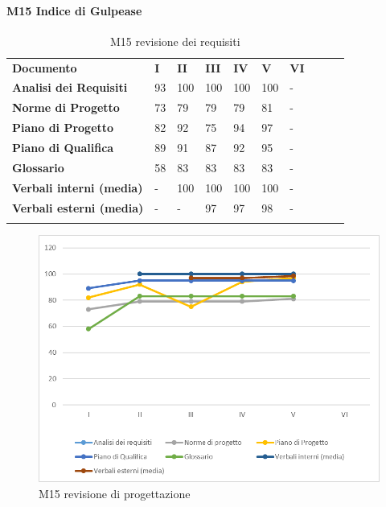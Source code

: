 \paragraph{M15 Indice di Gulpease}\mbox{}
\begin{longtable} {						
		>{}p{50mm}  		
		>{}p{8mm}		
		>{}p{8mm}		
		>{}p{8mm}		
		>{}p{8mm}		
		>{}p{8mm}		
		>{}p{8mm}
		>{}p{8mm}
		>{}p{8mm}
		>{}p{8mm}				
	}			
	\rowcolor{gray!50}
	\textbf{Documento} & \textbf{I} & \textbf{II} & \textbf{III} & \textbf{IV} & \textbf{V} & \textbf{VI} \TBstrut \\ [2mm]
	\textbf{Analisi dei Requisiti} & 93 & 100 & 100 & 100 & 100 & - \TBstrut \\ [2mm]
	\textbf{Norme di Progetto} & 73 & 79 & 79 & 79 & 81 & - \TBstrut \\ [2mm]
	\textbf{Piano di Progetto} & 82 & 92 & 75 & 94 & 97 & - \TBstrut \\ [2mm]
	\textbf{Piano di Qualifica} & 89 & 91 & 87 & 92 & 95 & - \TBstrut \\ [2mm]
	\textbf{Glossario} & 58 & 83 & 83 & 83 & 83 & - \TBstrut \\ [2mm]
	\textbf{Verbali interni (media)} & - & 100 & 100 & 100 & 100 & - \TBstrut \\ [2mm]
	\textbf{Verbali esterni (media)} & - & - & 97 & 97 & 98 & - \TBstrut \\ [2mm]
	\rowcolor{white}
	\caption{M15 revisione dei requisiti}
\end{longtable}
\begin{figure}[H] 	
	\includegraphics[width=\linewidth]{./img/grafici/RP18.png}	
	\caption{M15 revisione di progettazione}	
\end{figure}
